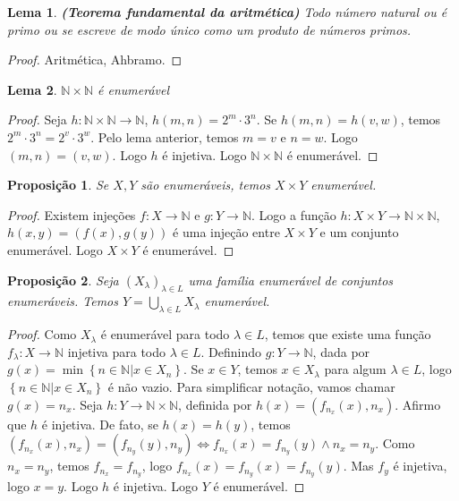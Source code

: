 \documentclass{article}
\newtheorem{prop}{Proposição}[section]
\theoremstyle{theorem}
\theoremstyle{lemma}
\newtheorem{lema}{Lema}
\theoremstyle{definition}
\theoremstyle{remark}
\begin{document}
\begin{lema}
	\textbf{(Teorema fundamental da aritmética)} Todo número natural ou é primo ou se escreve de modo único como um produto de números primos.
\end{lema}
\begin{proof}
	Aritmética, Ahbramo. %
\end{proof}
\begin{lema}
	$\mathbb{N} \times \mathbb{N}$ é enumerável
\end{lema}
\begin{proof}
	Seja $h:\mathbb{N} \times \mathbb{N} \to \mathbb{N}$, $ h(m,n) = 2^m\cdot 3^n$. Se $h(m,n) = h(v,w)$, temos $2^m\cdot 3^n = 2^v\cdot 3^w$. Pelo lema anterior, temos $m = v$ e $n = w$. Logo $(m,n) = (v,w)$. Logo $h$ é injetiva. Logo $\mathbb{N}\times \mathbb{N}$ é enumerável.
\end{proof}
\begin{prop}
	Se $X,Y$ são enumeráveis, temos $X\times Y$ enumerável.
\end{prop}
\begin{proof}
	Existem injeções $f: X \to \mathbb{N}$ e $g: Y \to \mathbb{N}$. Logo a função $h : X \times Y \to \mathbb{N} \times \mathbb{N}$, $h(x,y) = (f(x), g(y))$ é uma injeção entre $X \times Y$ e um conjunto enumerável.  Logo $X\times Y$ é enumerável.
\end{proof}
\begin{prop}
	Seja $(X_{\lambda})_{\lambda \in L}$ uma família enumerável de conjuntos enumeráveis. Temos $Y = \displaystyle\bigcup_{\lambda \in L} X_{\lambda}$ enumerável.
\end{prop}
\begin{proof}
	Como $X_{\lambda}$ é enumerável para todo $\lambda\in L$, temos que existe uma função $f_\lambda : X \to \mathbb{N}$ injetiva para todo $\lambda\in L$. Definindo $g: Y \to \mathbb{N}$, dada por $g(x) = \min \left\{ n\in \mathbb{N} | x \in X_n \right\}$. Se $x\in Y$, temos $x\in X_\lambda$ para algum $\lambda \in L$, logo $\left\{n \in \mathbb{N} |  x\in X_{n}\right\}$ é não vazio. Para simplificar notação, vamos chamar $g(x) = n_x$.  Seja $h: Y \to \mathbb{N} \times \mathbb{N}$, definida por $h(x) = \left( f_{n_x}(x), n_x\right)$.  Afirmo que $h$ é injetiva. De fato, se $h(x) = h(y)$, temos $(f_{n_x}(x), n_x) = (f_{n_y}(y), n_y) \iff f_{n_x}(x) = f_{n_y}(y) \land n_x = n_y$. Como $n_x = n_y$, temos  $f_{n_x} = f_{n_y}$, logo $f_{n_x}(x) = f_{n_y}(x) = f_{n_y}(y)$. Mas $f_y$ é injetiva, logo $x = y$. Logo $h$ é injetiva. Logo $Y$ é enumerável.
\end{proof}
\end{document}
